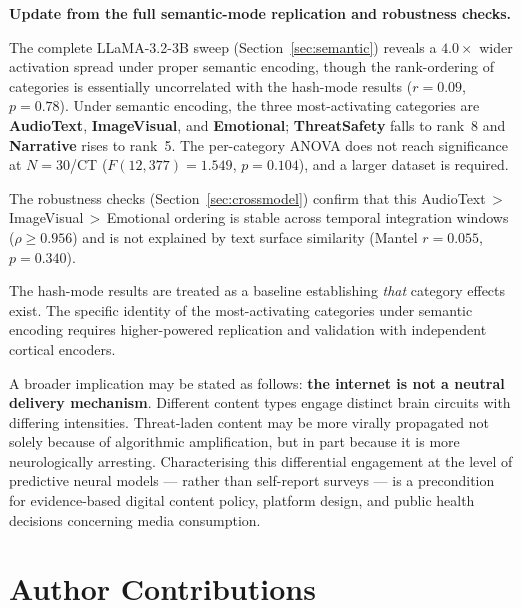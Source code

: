 \documentclass[11pt,letterpaper]{article}
\numberwithin{equation}{section}
\begin{document}
\begin{quotebox}
\textbf{Update from the full semantic-mode replication and robustness checks.}

The complete LLaMA-3.2-3B sweep (Section~\ref{sec:semantic}) reveals a $4.0\times$ wider activation spread under proper semantic encoding, though the rank-ordering of categories is essentially uncorrelated with the hash-mode results ($r=0.09$, $p=0.78$). Under semantic encoding, the three most-activating categories are \textbf{AudioText}, \textbf{ImageVisual}, and \textbf{Emotional}; \textbf{ThreatSafety} falls to rank~8 and \textbf{Narrative} rises to rank~5. The per-category ANOVA does not reach significance at $N=30$/CT ($F(12,377)=1.549$, $p=0.104$), and a larger dataset is required.

The robustness checks (Section~\ref{sec:crossmodel}) confirm that this AudioText\,$>$\,ImageVisual\,$>$\,Emotional ordering is stable across temporal integration windows ($\rho \geq 0.956$) and is not explained by text surface similarity (Mantel $r=0.055$, $p=0.340$).

The hash-mode results are treated as a baseline establishing \textit{that} category effects exist. The specific identity of the most-activating categories under semantic encoding requires higher-powered replication and validation with independent cortical encoders.
\end{quotebox}

A broader implication may be stated as follows: \textbf{the internet is not a neutral delivery mechanism}. Different content types engage distinct brain circuits with differing intensities. Threat-laden content may be more virally propagated not solely because of algorithmic amplification, but in part because it is more neurologically arresting. Characterising this differential engagement at the level of predictive neural models — rather than self-report surveys — is a precondition for evidence-based digital content policy, platform design, and public health decisions concerning media consumption.

\FloatBarrier
\clearpage

\section*{Author Contributions}
\end{document}
